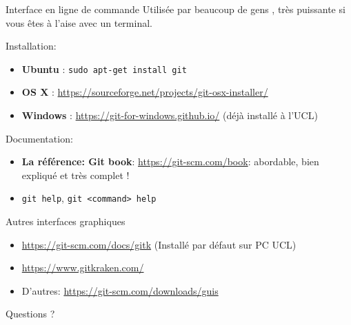 \documentclass{beamer}
\begin{document}
\begin{frame}{Interface en ligne de commande}
    Utilisée par beaucoup de gens , très puissante si vous êtes à l'aise avec
    un terminal.

    Installation:
    \begin{itemize}
        \item \textbf{Ubuntu} : \texttt{sudo apt-get install git}
        \item \textbf{OS X} : \url{https://sourceforge.net/projects/git-osx-installer/}
        \item \textbf{Windows} : \url{https://git-for-windows.github.io/} (déjà
            installé à l'UCL)
    \end{itemize}

    Documentation:
    \begin{itemize}
        \item \textbf{La référence: Git book}: \url{https://git-scm.com/book}:
            abordable, bien expliqué et très complet !
        \item \texttt{git help}, \texttt{git <command> help}
    \end{itemize}
\end{frame}

\begin{frame}{Autres interfaces graphiques}
    \begin{itemize}
        \item \url{https://git-scm.com/docs/gitk} (Installé par défaut sur PC UCL)
        \item \url{https://www.gitkraken.com/}
        \item D'autres: \url{https://git-scm.com/downloads/guis}
    \end{itemize}
\end{frame}

\begin{frame}[standout]
    Questions ?
\end{frame}
\end{document}
